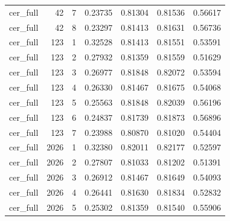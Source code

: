 \begin{tabular}{lrrrrrr}
cer_full & 42 & 7 & 0.23735 & 0.81304 & 0.81536 & 0.56617 \\
cer_full & 42 & 8 & 0.23297 & 0.81413 & 0.81631 & 0.56736 \\
cer_full & 123 & 1 & 0.32528 & 0.81413 & 0.81551 & 0.53591 \\
cer_full & 123 & 2 & 0.27932 & 0.81359 & 0.81559 & 0.51629 \\
cer_full & 123 & 3 & 0.26977 & 0.81848 & 0.82072 & 0.53594 \\
cer_full & 123 & 4 & 0.26330 & 0.81467 & 0.81675 & 0.54068 \\
cer_full & 123 & 5 & 0.25563 & 0.81848 & 0.82039 & 0.56196 \\
cer_full & 123 & 6 & 0.24837 & 0.81739 & 0.81873 & 0.56896 \\
cer_full & 123 & 7 & 0.23988 & 0.80870 & 0.81020 & 0.54404 \\
cer_full & 2026 & 1 & 0.32380 & 0.82011 & 0.82177 & 0.52597 \\
cer_full & 2026 & 2 & 0.27807 & 0.81033 & 0.81202 & 0.51391 \\
cer_full & 2026 & 3 & 0.26912 & 0.81467 & 0.81649 & 0.54093 \\
cer_full & 2026 & 4 & 0.26441 & 0.81630 & 0.81834 & 0.52832 \\
cer_full & 2026 & 5 & 0.25302 & 0.81359 & 0.81540 & 0.55906 \\
\bottomrule
\end{tabular}

